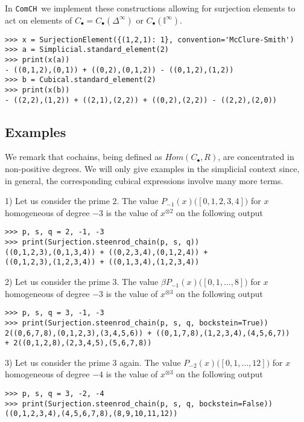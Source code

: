 \documentclass{amsart}
\newcommand{\comch}{\texttt{ComCH}}
\begin{document}
In \comch\, we implement these constructions allowing for surjection elements to act on elements of $C_\bullet = C_\bullet(\Delta^\infty)$ or $C_\bullet(\mathbb I^\infty)$.

\begin{Verbatim}[frame=single]
>>> x = SurjectionElement({(1,2,1): 1}, convention='McClure-Smith')
>>> a = Simplicial.standard_element(2)
>>> print(x(a))
- ((0,1,2),(0,1)) + ((0,2),(0,1,2)) - ((0,1,2),(1,2))
>>> b = Cubical.standard_element(2)
>>> print(x(b))
- ((2,2),(1,2)) + ((2,1),(2,2)) + ((0,2),(2,2)) - ((2,2),(2,0))
\end{Verbatim}

\subsection{Examples}

We remark that cochains, being defined as $Hom(C_\bullet, R)$, are concentrated in non-positive degrees. We will only give examples in the simplicial context since, in general, the corresponding cubical expressions involve many more terms.

1) Let us consider the prime $2$. The value $P_{-1}(x)\big([0,1,2,3,4]\big)$ for $x$ homogeneous of degree $-3$ is the value of $x^{\otimes 2}$ on the following output
\begin{Verbatim}[frame=single]
>>> p, s, q = 2, -1, -3
>>> print(Surjection.steenrod_chain(p, s, q))
((0,1,2,3),(0,1,3,4)) + ((0,2,3,4),(0,1,2,4)) +
((0,1,2,3),(1,2,3,4)) + ((0,1,3,4),(1,2,3,4))
\end{Verbatim}

2) Let us consider the prime $3$. The value $\beta P_{-1}(x)\big([0,1,\dots,8]\big)$ for $x$ homogeneous of degree $-3$ is the value of $x^{\otimes 3}$ on the following output
\begin{Verbatim}[frame=single]
>>> p, s, q = 3, -1, -3
>>> print(Surjection.steenrod_chain(p, s, q, bockstein=True))
2((0,6,7,8),(0,1,2,3),(3,4,5,6)) + ((0,1,7,8),(1,2,3,4),(4,5,6,7))
+ 2((0,1,2,8),(2,3,4,5),(5,6,7,8))
\end{Verbatim}

3) Let us consider the prime $3$ again. The value $P_{-2}(x)\big([0,1,\dots,12]\big)$ for $x$ homogeneous of degree $-4$ is the value of $x^{\otimes 3}$ on the following output
\begin{Verbatim}[frame=single]
>>> p, s, q = 3, -2, -4
>>> print(Surjection.steenrod_chain(p, s, q, bockstein=False))
((0,1,2,3,4),(4,5,6,7,8),(8,9,10,11,12))
\end{Verbatim}
\end{document}
